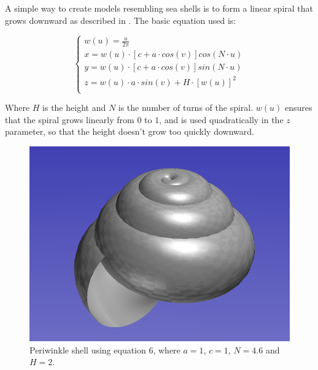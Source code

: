 \documentclass[a4paper]{article}
\begin{document}
A simple way to create models resembling sea shells is to form a linear spiral that grows downward as described in \cite{povray-seashells}. The basic equation used is:

\begin{equation}
	\begin{cases}
		w(u) = \frac{u}{2\pi}\\
		x = w(u) \cdot [c + a \cdot cos(v)] cos(N \cdot u)\\
		y = w(u) \cdot [c + a \cdot cos(v)] sin(N \cdot u)\\
		z = w(u) \cdot a \cdot sin(v) + H \cdot [w(u)]^2\\
	\end{cases}
\end{equation}

Where $H$ is the height and $N$ is the number of turns of the spiral. $w(u)$ ensures that the spiral grows linearly from $0$ to $1$, and is used quadratically in the $z$ parameter, so that the height doesn't grow too quickly downward.

\begin{figure}[h]
	\centering\includegraphics[scale=0.3]{./img/ShellPeriwinkle.png}
	\caption{Periwinkle shell using equation 6, where $a = 1$, $c = 1$, $N = 4.6$ and $H = 2$. \cite{povray-seashells}}
	\label{periwinkle} %
\end{figure}

\pagebreak
\end{document}
